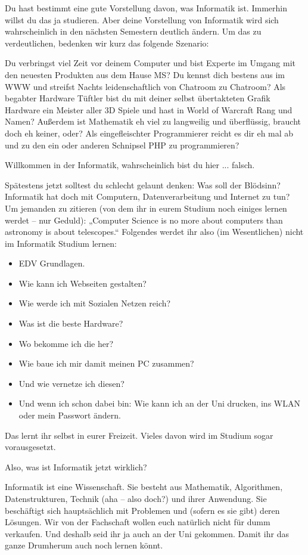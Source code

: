 \spaltenanfang
Du hast bestimmt eine gute Vorstellung davon, was Informatik ist. Immerhin willst du das ja studieren. Aber deine Vorstellung von Informatik wird sich wahrscheinlich in den n\"achsten Semestern deutlich \"andern.
Um das zu verdeutlichen, bedenken wir kurz das folgende Szenario:

Du verbringst viel Zeit vor deinem Computer und bist Experte im Umgang mit den neuesten Produkten aus dem Hause MS? Du kennst dich bestens aus im WWW und streifst Nachts leidenschaftlich von Chatroom zu Chatroom? Als begabter Hardware Tüftler bist du mit deiner selbst übertakteten Grafik Hardware ein Meister aller 3D Spiele und hast in World of Warcraft Rang und Namen? Außerdem ist Mathematik eh viel zu langweilig und überflüssig, braucht doch eh keiner, oder? Als eingefleischter Programmierer reicht es dir eh mal ab und zu den ein oder anderen Schnipsel PHP zu programmieren?

Willkommen in der Informatik, wahrscheinlich bist du hier ... falsch.


Spätestens jetzt solltest du schlecht gelaunt denken:
Was soll der Blödsinn? Informatik hat doch mit Computern, Datenverarbeitung 
und Internet zu tun? Um jemanden zu zitieren (von dem ihr in eurem Studium noch
einiges lernen werdet – nur Geduld): „Computer Science is no more about
computers than astronomy is about telescopes.“ Folgendes werdet ihr also (im
Wesentlichen) nicht im Informatik Studium lernen:

\begin{itemize}
     \item EDV Grundlagen.
     \item Wie kann ich Webseiten gestalten?
     \item Wie werde ich mit Sozialen Netzen reich?
     \item Was ist die beste Hardware?
     \item Wo bekomme ich die her?
     \item Wie baue ich mir damit meinen PC zusammen?
     \item Und wie vernetze ich diesen?
     \item Und wenn ich schon dabei bin: Wie kann ich an der Uni drucken, ins WLAN oder mein Passwort \"andern.
\end{itemize}

Das lernt ihr selbst in eurer Freizeit. Vieles davon wird im Studium sogar vorausgesetzt.

Also, was ist Informatik jetzt wirklich?

Informatik ist eine Wissenschaft. Sie besteht aus Mathematik, Algorithmen,
Datenstrukturen, Technik (aha – also doch?) und ihrer Anwendung. Sie
beschäftigt sich hauptsächlich mit Problemen und (sofern es sie gibt) deren
Lösungen. Wir von der Fachschaft wollen euch natürlich nicht für dumm
verkaufen. Und deshalb seid ihr ja auch an der Uni gekommen. Damit ihr das ganze Drumherum auch noch lernen k\"onnt.

\spaltenende
